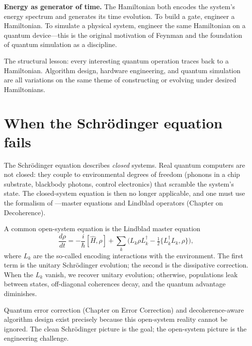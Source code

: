 \textbf{Energy as generator of time.} The Hamiltonian both encodes the system's energy spectrum and generates its time evolution. To build a gate, engineer a Hamiltonian. To simulate a physical system, engineer the same Hamiltonian on a quantum device---this is the original motivation of Feynman \citep{feynman_simulating_1982} and the foundation of quantum simulation as a discipline.

\begin{remark}
The structural lesson: every interesting quantum operation traces back to a Hamiltonian. Algorithm design, hardware engineering, and quantum simulation are all variations on the same theme of constructing or evolving under desired Hamiltonians.
\end{remark}

\section{When the Schr\"odinger equation fails}

The Schr\"odinger equation describes \emph{closed} systems. Real quantum computers are not closed: they couple to environmental degrees of freedom (phonons in a chip substrate, blackbody photons, control electronics) that scramble the system's state. The closed-system equation is then no longer applicable, and one must use the formalism of ---master equations and Lindblad operators (Chapter on Decoherence).

A common open-system equation is the Lindblad master equation
\[
  \frac{d\rho}{dt} = -\frac{i}{\hbar}[\hat H,\rho] + \sum_k \Big(L_k\rho L_k^\dagger - \tfrac{1}{2}\{L_k^\dagger L_k,\rho\}\Big),
\]
where $L_k$ are the so-called  encoding interactions with the environment. The first term is the unitary Schr\"odinger evolution; the second is the dissipative correction. When the $L_k$ vanish, we recover unitary evolution; otherwise, populations leak between states, off-diagonal coherences decay, and the quantum advantage diminishes.

Quantum error correction (Chapter on Error Correction) and decoherence-aware algorithm design exist precisely because this open-system reality cannot be ignored. The clean Schr\"odinger picture is the goal; the open-system picture is the engineering challenge.

